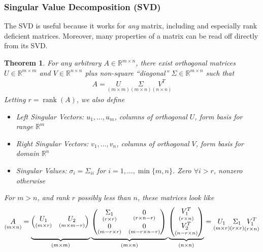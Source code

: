 \documentclass[12pt]{article}
\numberwithin{equation}{section} %
\theoremstyle{plain}
\newtheorem{thm}{Theorem}[section]
\theoremstyle{definition}
\theoremstyle{remark}
\newcommand{\Rn}{\mathbb{R}^n}
\newcommand{\Rm}{\mathbb{R}^m}
\newcommand{\Rmn}{\mathbb{R}^{m\times n}}
\newcommand{\Rmm}{\mathbb{R}^{m\times m}}
\newcommand{\Rnn}{\mathbb{R}^{n\times n}}
\newcommand{\rank}{\operatorname{rank}}
\begin{document}
\clearpage
\subsubsection{Singular Value Decomposition (SVD)}

The SVD is  useful because it works for \emph{any} matrix, including and
especially rank deficient matrices. Moreover, many properties of a
matrix can be read off directly from its SVD.

\begin{thm}
For any arbitrary $A\in\Rmn$, there exist orthogonal matrices $U\in\Rmm$
and $V\in\Rnn$ plus non-square ``diagonal'' $\Sigma\in\Rmn$ such that
\begin{align*}
  A
  =
  \underset{(m\times m)}{U}
  \underset{(m\times n)}{\Sigma}
  \underset{(n\times n)}{V^T}
\end{align*}
Letting $r=\rank(A)$, we also define
\begin{itemize}
  \item \emph{Left Singular Vectors}: $u_1,\ldots,u_m$, columns of
    orthogonal $U$, form basis for range $\Rm$
  \item \emph{Right Singular Vectors}: $v_1,\ldots,v_n$, columns of
    orthogonal $V$, form basis for domain $\Rn$
  \item \emph{Singular Values}: $\sigma_i=\Sigma_{ii}$ for
    $i=1,\ldots,\min\{m,n\}$. Zero $\forall i> r$, nonzero
    otherwise
\end{itemize}
For $m>n$, and rank $r$ possibly less than $n$, these matrices look like
\begin{align}
  \underset{(m\times n)}{A}
  =
  \underbrace{%
    \begin{pmatrix}
      \underset{(m\times r)}{U_1}
      &
      \underset{(m\times m-r)}{U_2}
    \end{pmatrix}
    \vphantom{%
    \begin{pmatrix}
      \underset{(r\times n)}{V_1^T}
      \\
      \underset{(n-r\times n)}{V^T_2}
    \end{pmatrix}
    }
  }_{(m\times m)}
  \underbrace{%
    \begin{pmatrix}
      \underset{(r\times r)}{\Sigma_1}
      &
      \underset{(r\times n-r)}{0}
      \\
      \underset{(m-r\times r)}{0}
      &
      \underset{(m-r\times n-r)}{0}
    \end{pmatrix}
    \vphantom{%
    \begin{pmatrix}
      \underset{(r\times n)}{V_1^T}
      \\
      \underset{(n-r\times n)}{V^T_2}
    \end{pmatrix}
    }
  }_{(m\times n)}
  \underbrace{%
    \begin{pmatrix}
      \underset{(r\times n)}{V_1^T}
      \\
      \underset{(n-r\times n)}{V^T_2}
    \end{pmatrix}
  }_{(n\times n)}
  =
  \underset{(m\times r)}{U_1}
  \underset{(r\times r)}{\Sigma_1}
  \underset{(r\times n)}{V_1^T}
  \label{svd}
\end{align}
\end{thm}
\end{document}
